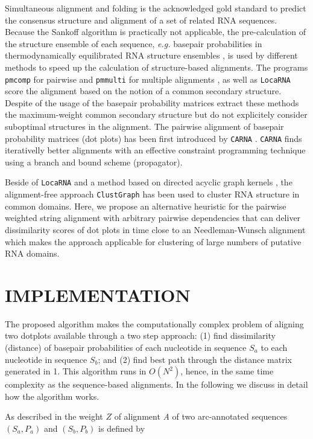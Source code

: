 \documentclass[a4paper,twoside]{article}
\newcommand\pmcomp{\texttt{pmcomp}}
\newcommand\pmmulti{\texttt{pmmulti}}
\newcommand\clustgraph{\texttt{ClustGraph}}
\newcommand\locarna{\texttt{LocaRNA}}
\newcommand\carna{\texttt{CARNA}}
\newcommand\eg{\textit{e.g.}}
\begin{document}
Simultaneous alignment and folding \cite{sankoff85} is the acknowledged gold
standard to predict the consensus structure and alignment of a set of related
RNA sequences. Because the Sankoff algorithm is practically not applicable, the
pre-calculation of the structure ensemble of each sequence, \eg{} basepair
probabilities in thermodynamically equilibrated RNA structure ensembles
\cite{McCaskill:1990}, is used by different methods to speed up the calculation
of structure-based alignments. The programs \pmcomp{} for pairwise and
\pmmulti{} for multiple alignments \cite{Hofacker15073017}, as well as
\locarna{} \cite{Will17432929} score the alignment based on the notion of a
common secondary structure. Despite of the usage of the basepair probability
matrices extract these methods the maximum-weight common secondary structure but
do not explicitely consider suboptimal structures in the alignment. The pairwise
alignment of basepair probability matrices (dot plots) has been first introduced
by \carna{} \cite{Palu2010,Sorescu2012}. \carna{} finds iterativelly better
alignments with an effective constraint programming technique using a branch and
bound scheme (propagator).

Beside of \locarna{} and a method based on directed acyclic graph kernels
\cite{Sato18647390}, the alignment-free approach \clustgraph{}
\cite{Heyne22689765} has been used to cluster RNA structure in common domains.
Here, we propose an alternative heuristic for the pairwise weighted string
alignment with arbitrary pairwise dependencies that can deliver dissimilarity
scores of dot plots in time close to an Needleman-Wunsch alignment which makes
the approach applicable for clustering of large numbers of putative RNA domains.


\section{\uppercase{Implementation}}

\noindent The proposed algorithm makes the computationally complex problem of
aligning two dotplots available through a two step approach: (1) find
dissimilarity (distance) of basepair probabilities of each nucleotide in
sequence $S_a$ to each nucleotide in sequence $S_b$; and (2) find best path
through the distance matrix generated in 1. This algorithm runs in $O(N^2)$,
hence, in the same time complexity as the sequence-based alignments. In the
following we discuss in detail how the algorithm works.

As described in \cite{Palu2010} the weight $Z$ of alignment \emph{A} of two
arc-annotated sequences $(S_a,P_a)$ and $(S_b,P_b)$ is defined by
\end{document}
